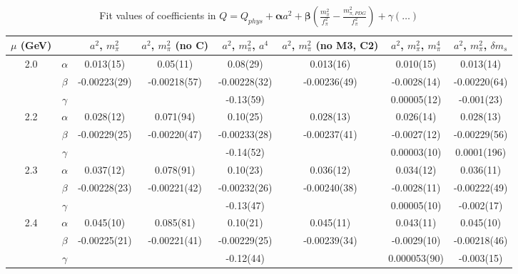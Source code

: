 \documentclass[12pt]{extarticle}
\begin{document}
\begin{table}[h!]
\begin{center}
\begin{tabular}{|c c|c|c|c|c|c|c|}
\hline
$\mu$ (GeV) &  & $a^2$, $m_\pi^2$& $a^2$, $m_\pi^2$ (no C)& $a^2$, $m_\pi^2$, $a^4$& $a^2$, $m_\pi^2$ (no M3, C2)& $a^2$, $m_\pi^2$, $m_\pi^4$& $a^2$, $m_\pi^2$, $\delta m_s$\\
\hline
\multirow{3}{0.5in}{2.0} & $\alpha$ & 0.013(15)& 0.05(11)& 0.08(29)& 0.013(16)& 0.010(15)& 0.013(14)\\
 & $\beta$ & -0.00223(29)& -0.00218(57)& -0.00228(32)& -0.00236(49)& -0.0028(14)& -0.00220(64)\\
 & $\gamma$ &  &  & -0.13(59)&  & 0.00005(12)& -0.001(23)\\
\hline
\multirow{3}{0.5in}{2.2} & $\alpha$ & 0.028(12)& 0.071(94)& 0.10(25)& 0.028(13)& 0.026(14)& 0.028(13)\\
 & $\beta$ & -0.00229(25)& -0.00220(47)& -0.00233(28)& -0.00237(41)& -0.0027(12)& -0.00229(56)\\
 & $\gamma$ &  &  & -0.14(52)&  & 0.00003(10)& 0.0001(196)\\
\hline
\multirow{3}{0.5in}{2.3} & $\alpha$ & 0.037(12)& 0.078(91)& 0.10(23)& 0.036(12)& 0.034(12)& 0.036(11)\\
 & $\beta$ & -0.00228(23)& -0.00221(42)& -0.00232(26)& -0.00240(38)& -0.0028(11)& -0.00222(49)\\
 & $\gamma$ &  &  & -0.13(47)&  & 0.00005(10)& -0.002(17)\\
\hline
\multirow{3}{0.5in}{2.4} & $\alpha$ & 0.045(10)& 0.085(81)& 0.10(21)& 0.045(11)& 0.043(11)& 0.045(10)\\
 & $\beta$ & -0.00225(21)& -0.00221(41)& -0.00229(25)& -0.00239(34)& -0.0029(10)& -0.00218(46)\\
 & $\gamma$ &  &  & -0.12(44)&  & 0.000053(90)& -0.003(15)\\
\hline
\end{tabular}
\caption{Fit values of coefficients in $Q = Q_{phys} + \mathbf{\alpha} a^2 + \mathbf{\beta}\left(\frac{m_\pi^2}{f_\pi^2}-\frac{m_{\pi,PDG}^2}{f_\pi^2}\right) + \gamma(\ldots)$}
\end{center}
\end{table}






\end{document}
